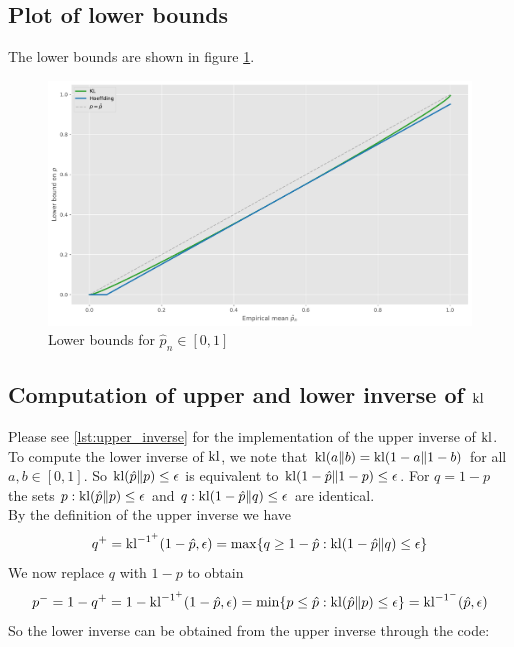 \subsection*{Plot of lower bounds}
The lower bounds are shown in figure \ref{fig:lower_bounds}.
\begin{center}
    \begin{figure}[ht]
        \includegraphics[scale=0.53]{figures/lower_bounds.pdf}
        \caption{Lower bounds for $\hat{p}_n \in [0,1]$}
        \label{fig:lower_bounds}
    \end{figure}
\end{center}

\subsection*{Computation of upper and lower inverse of $\operatorname{kl}$}
Please see \ref{lst:upper_inverse} for the implementation of the upper inverse of $\operatorname{kl}$. To compute the lower inverse of $\operatorname{kl}$, we note that $\operatorname{kl}(a\|b)=\operatorname{kl}(1-a\|1-b)$ for all $a,b \in [0,1]$. So $\operatorname{kl}(\hat{p}\|p) \leq \epsilon$ is equivalent to $\operatorname{kl}(1-\hat{p}\|1-p) \leq \epsilon$. For $q=1-p$ the sets ${p : \operatorname{kl}(\hat{p}\|p) \leq \epsilon}$ and ${q : \operatorname{kl}(1-\hat{p}\|q) \leq \epsilon}$ are identical.
\\[2mm]
By the definition of the upper inverse we have 
\begin{equation*}
    q^+ = \operatorname{kl}^{-1^+} (1-\hat{p}, \epsilon) = \max \{q \geq 1-\hat{p} : \operatorname{kl}(1-\hat{p}\|q) \leq \epsilon \}
\end{equation*}
We now replace $q$ with $1-p$ to obtain
\begin{equation*}
    p^- = 1-q^+ = 1-  \operatorname{kl}^{-1^+} (1-\hat{p}, \epsilon) = \min \{p \leq \hat{p}  : \operatorname{kl}(\hat{p}\|p) \leq \epsilon \} = \operatorname{kl}^{-1^-}(\hat{p}, \epsilon )
\end{equation*}
So the lower inverse can be obtained from the upper inverse through the code:


